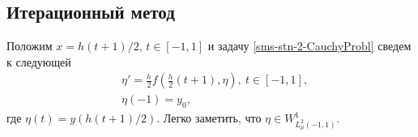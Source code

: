 
\subsection{Итерационный метод}

Положим $x=h(t+1)/2$, $t\in[-1,1]$ и задачу \eqref{sms-stn-2-CauchyProbl} сведем к следующей
\begin{equation}\label{sms-stn-2-CauchyProblEta}
\begin{aligned}
&\eta'=\frac h2f\left(\frac h2(t+1),\eta\right),\ t\in[-1,1],\\
&\eta(-1)=y_0,
\end{aligned}
\end{equation}
где $\eta(t)= y(h(t+1)/2)$. Легко заметить, что $\eta\in W^1_{L^2_\mu(-1,1)}$.


